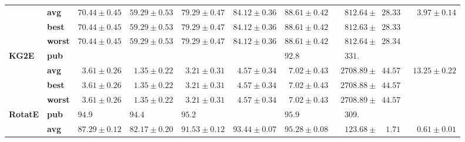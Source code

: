 \begin{tabular}{llrrrrrrr}
       & \textbf{avg} &            $70.44 \pm 0.45$ &            $59.29 \pm 0.53$ &            $79.29 \pm 0.47$ &            $84.12 \pm 0.36$ &            $88.61 \pm 0.42$ &  $\phantom{00}812.64 \pm \phantom{0}28.33$ &  $\phantom{00}3.97 \pm 0.14$ \\
       & \textbf{best} &            $70.44 \pm 0.45$ &            $59.29 \pm 0.53$ &            $79.29 \pm 0.47$ &            $84.12 \pm 0.36$ &            $88.61 \pm 0.42$ &  $\phantom{00}812.63 \pm \phantom{0}28.33$ &                              \\
       & \textbf{worst} &            $70.44 \pm 0.45$ &            $59.29 \pm 0.53$ &            $79.29 \pm 0.47$ &            $84.12 \pm 0.36$ &            $88.61 \pm 0.42$ &  $\phantom{00}812.64 \pm \phantom{0}28.34$ &                              \\\midrule
\textbf{KG2E} & \textbf{pub} &                             &                             &                             &                             &  $92.8\phantom{0 \pm 0.00}$ &  $\phantom{00}331.\phantom{00 \pm 000.00}$ &                              \\
       & \textbf{avg} &  $\phantom{0}3.61 \pm 0.26$ &  $\phantom{0}1.35 \pm 0.22$ &  $\phantom{0}3.21 \pm 0.31$ &  $\phantom{0}4.57 \pm 0.34$ &  $\phantom{0}7.02 \pm 0.43$ &  $\phantom{0}2708.89 \pm \phantom{0}44.57$ &  $\phantom{0}13.25 \pm 0.22$ \\
       & \textbf{best} &  $\phantom{0}3.61 \pm 0.26$ &  $\phantom{0}1.35 \pm 0.22$ &  $\phantom{0}3.21 \pm 0.31$ &  $\phantom{0}4.57 \pm 0.34$ &  $\phantom{0}7.02 \pm 0.43$ &  $\phantom{0}2708.88 \pm \phantom{0}44.57$ &                              \\
       & \textbf{worst} &  $\phantom{0}3.61 \pm 0.26$ &  $\phantom{0}1.35 \pm 0.22$ &  $\phantom{0}3.21 \pm 0.31$ &  $\phantom{0}4.57 \pm 0.34$ &  $\phantom{0}7.02 \pm 0.43$ &  $\phantom{0}2708.89 \pm \phantom{0}44.57$ &                              \\\midrule
\textbf{RotatE} & \textbf{pub} &  $94.9\phantom{0 \pm 0.00}$ &  $94.4\phantom{0 \pm 0.00}$ &  $95.2\phantom{0 \pm 0.00}$ &                             &  $95.9\phantom{0 \pm 0.00}$ &  $\phantom{00}309.\phantom{00 \pm 000.00}$ &                              \\
       & \textbf{avg} &            $87.29 \pm 0.12$ &            $82.17 \pm 0.20$ &            $91.53 \pm 0.12$ &            $93.44 \pm 0.07$ &            $95.28 \pm 0.08$ &  $\phantom{00}123.68 \pm \phantom{00}1.71$ &  $\phantom{00}0.61 \pm 0.01$ \\\midrule

\end{tabular}
